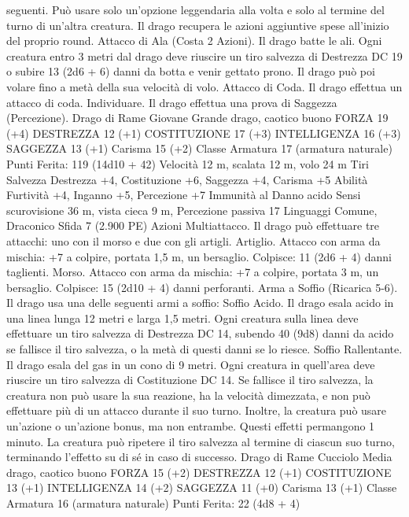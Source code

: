 \begin{multicols}{2}
seguenti. Può usare solo un’opzione leggendaria alla volta e solo
al termine del turno di un’altra creatura. Il drago recupera le
azioni aggiuntive spese all’inizio del proprio round.
Attacco di Ala (Costa 2 Azioni). Il drago batte le ali. Ogni creatura
entro 3 metri dal drago deve riuscire un tiro salvezza di Destrezza
DC 19 o subire 13 (2d6 + 6) danni da botta e venir gettato prono.
Il drago può poi volare fino a metà della sua velocità di volo.
Attacco di Coda. Il drago effettua un attacco di coda.
Individuare. Il drago effettua una prova di Saggezza (Percezione).
Drago di Rame Giovane
Grande drago, caotico buono
FORZA 19 (+4)
DESTREZZA 12 (+1)
COSTITUZIONE 17 (+3)
INTELLIGENZA 16 (+3)
SAGGEZZA 13 (+1)
Carisma 15 (+2)
Classe Armatura 17 (armatura naturale)
\hspace*{0pt}\hfill{Punti Ferita}: 119 (14d10 + 42)
Velocità 12 m, scalata 12 m, volo 24 m
Tiri Salvezza Destrezza +4, Costituzione +6, Saggezza +4, Carisma +5
Abilità Furtività +4, Inganno +5, Percezione +7
Immunità al Danno acido
Sensi scurovisione 36 m, vista cieca 9 m, Percezione passiva 17
Linguaggi Comune, Draconico
Sfida 7 (2.900 PE)
Azioni
Multiattacco. Il drago può effettuare tre attacchi: uno con il
morso e due con gli artigli.
Artiglio. Attacco con arma da mischia: +7 a colpire, portata 1,5
m, un bersaglio.
Colpisce: 11 (2d6 + 4) danni taglienti.
Morso. Attacco con arma da mischia: +7 a colpire, portata 3 m,
un bersaglio.
Colpisce: 15 (2d10 + 4) danni perforanti.
Arma a Soffio (Ricarica 5-6). Il drago usa una delle seguenti armi
a soffio:
Soffio Acido. Il drago esala acido in una linea lunga 12 metri e larga
1,5 metri. Ogni creatura sulla linea deve effettuare un tiro salvezza di
Destrezza DC 14, subendo 40 (9d8) danni da acido se fallisce il tiro
salvezza, o la metà di questi danni se lo riesce.
Soffio Rallentante. Il drago esala del gas in un cono di 9 metri. Ogni
creatura in quell’area deve riuscire un tiro salvezza di Costituzione
DC 14. Se fallisce il tiro salvezza, la creatura non può usare la sua
reazione, ha la velocità dimezzata, e non può effettuare più di un
attacco durante il suo turno. Inoltre, la creatura può usare un’azione o
un’azione bonus, ma non entrambe. Questi effetti permangono 1
minuto. La creatura può ripetere il tiro salvezza al termine di ciascun
suo turno, terminando l’effetto su di sé in caso di successo.
Drago di Rame Cucciolo
Media drago, caotico buono
FORZA 15 (+2)
DESTREZZA 12 (+1)
COSTITUZIONE 13 (+1)
INTELLIGENZA 14 (+2)
SAGGEZZA 11 (+0)
Carisma 13 (+1)
Classe Armatura 16 (armatura naturale)
\hspace*{0pt}\hfill{Punti Ferita}: 22 (4d8 + 4)

\end{multicols}
